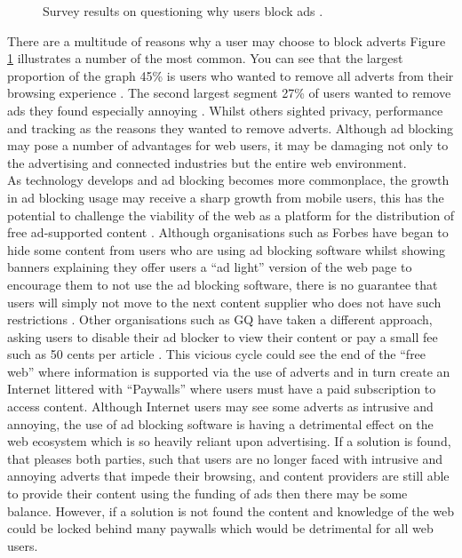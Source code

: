 \documentclass[12pt]{article}
\begin{document}
\begin{figure} [H]
    \centering
        \caption{Survey results on questioning why users block ads \parencite{publishersWeb}.}
        \label{fig:adBlockingChart}
\end{figure}

There are a multitude of reasons why a user may choose to block adverts Figure \ref{fig:adBlockingChart} illustrates a number of the most common. You can see that the largest proportion of the graph 45\% is users who wanted to remove all adverts from their browsing experience \parencite{publishersWeb}. The second largest segment 27\% of users wanted to remove ads they found especially annoying \parencite{publishersWeb}. Whilst others sighted privacy, performance and tracking as the reasons they wanted to remove adverts. Although ad blocking may pose a number of advantages for web users, it may be damaging not only to the advertising and connected industries but the entire web environment. \\

As technology develops and ad blocking becomes more commonplace, the growth in ad blocking usage may receive a sharp growth from mobile users,  this has the potential to challenge the viability of the web as a platform for the distribution of free ad-supported content \parencite{adobeAdBlock}. Although organisations such as Forbes have began to hide some content from users who are using ad blocking software whilst showing banners explaining they offer users a ``ad light'' version of the web page to encourage them to not use the ad blocking software, there is no guarantee that users will simply not move to the next content supplier who does not have such restrictions \parencite{publishersWeb}. Other organisations such as GQ have taken a different approach, asking users to disable their ad blocker to view their content or pay a small fee such as 50 cents per article \parencite{gq}.  This vicious cycle could see the end of the ``free web'' where information is supported via the use of adverts and in turn create an Internet littered with ``Paywalls'' where users must have a paid subscription to access content. Although Internet users may see some adverts as intrusive and annoying, the use of ad blocking software is having a detrimental effect on the web ecosystem which is so heavily reliant upon advertising. If a solution is found, that pleases both parties, such that users are no longer faced with intrusive and annoying adverts that impede their browsing, and content providers are still able to provide their content using the funding of ads then there may be some balance. However, if a solution is not found the content and knowledge of the web could be locked behind many paywalls which would be detrimental for all web users.
\end{document}
